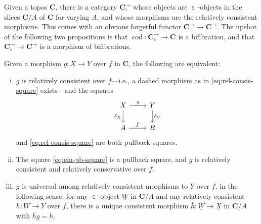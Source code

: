 \documentclass{amsart}
\makeatletter
\newcommand\bC{\mathbf{C}}
\newcommand\cod{\operatorname{cod}}
\newcommand\ein{\mathrel{\varepsilon}}
\newcommand\und[1]{\underline{#1}}
\newcommand\unein{{\ein}}
\newcommand\prooflabel[1]{\gdef\proof@label{#1}}
\def\proof@label{}
\theoremstyle{definition}
\theoremstyle{remark}
\theoremstyle{plainwithref}
\makeatother
\begin{document}
Given a topos \( \bC \), there is a category \( \bC^\to_{\ein} \) whose objects are \( \unein \)-objects in the slices \( \bC / A \) of \( \bC \) for varying \( A \), and whose morphisms are the relatively consistent morphisms.
This comes with an obvious forgetful functor \( \bC^\to_{\ein} \to \bC^\to \).
The upshot of the following two propositions is that \( \cod \colon \bC^\to_{\ein} \to \bC \) is a bifibration, and that \( \bC^\to_{\ein} \to \bC^\to \) is a morphism of bifibrations.

\prooflabel{proof:ein-pb-conds}
\begin{propn} \label{propn:ein-pb-conds}
  Given a morphism \( g \colon X \to Y \) over \( f \) in \( \bC \), the following are equivalent:
  \begin{enumerate}[(i)]
  \item\label{item:ein-pb-conds-pbs} \( g \) is relatively consistent over \( f \)---i.e., a dashed morphism as in \eqref{eq:rel-consis-square} exists---and the squares
    \begin{equation} \label{eq:ein-pb-square}
      \begin{tikzcd}
        X \ar[r, "g"] \ar[d, "\delta_X"'] & Y \ar[d, "\delta_Y"] \\
        A \ar[r, "f"] & B
      \end{tikzcd}
    \end{equation}
    and \eqref{eq:rel-consis-square} are both pullback squares.
  \item\label{item:ein-pb-conds-rel-consv} The square \eqref{eq:ein-pb-square} is a pullback square, and \( g \) is relatively consistent and relatively conservative over \( f \).
  \item\label{item:ein-pb-conds-univ} \( g \) is universal among relatively consistent morphisms to \( Y \) over \( f \), in the following sense:
    for any \( \unein \)-object \( \und W \) in \( \bC / A \) and any relatively consistent \( h \colon W \to Y \) over \( f \), there is a unique consistent morphism \( \bar h \colon \und W \to \und X \) in \( \bC / A \) with \( \bar h g = h \).
  \end{enumerate}
\end{propn}
\end{document}
